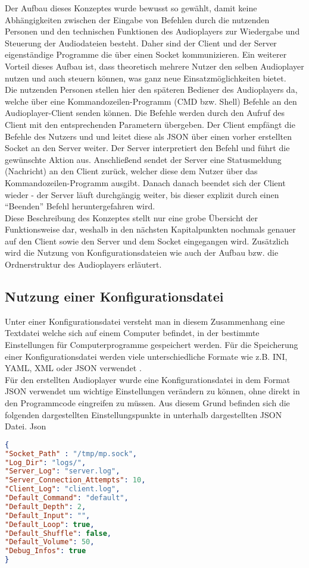 Der Aufbau dieses Konzeptes wurde bewusst so gewählt, damit keine
Abhängigkeiten zwischen der Eingabe von Befehlen durch die nutzenden Personen
und den technischen Funktionen des Audioplayers zur Wiedergabe und Steuerung
der Audiodateien besteht. Daher sind der Client und der Server eigenständige
Programme die über einen Socket kommunizieren. Ein weiterer Vorteil dieses
Aufbau ist, dass theoretisch mehrere Nutzer den selben Audioplayer nutzen und
auch steuern können, was ganz neue Einsatzmöglichkeiten bietet. \\ 
Die nutzenden Personen stellen hier den späteren Bediener des Audioplayers da,
welche über eine Kommandozeilen-Programm (\ac{CMD} bzw. Shell) Befehle an den
Audioplayer-Client senden können. Die Befehle werden durch den Aufruf des
Client mit den entsprechenden Parametern übergeben. Der Client empfängt die
Befehle des Nutzers und und leitet diese als \ac{JSON} über einen vorher
erstellten Socket an den Server weiter. Der Server interpretiert den Befehl und
führt die gewünschte Aktion aus. Anschließend sendet der Server eine
Statusmeldung (Nachricht) an den Client zurück, welcher diese dem Nutzer über
das Kommandozeilen-Programm ausgibt. Danach danach beendet sich der Client
wieder - der Server läuft durchgängig weiter, bis dieser explizit durch einen
\enquote{Beenden} Befehl heruntergefahren wird. \\ 
Diese Beschreibung des
Konzeptes stellt nur eine grobe Übersicht der Funktionsweise dar, weshalb in
den nächsten Kapitalpunkten nochmals genauer auf den Client sowie den Server
und dem Socket eingegangen wird. Zusätzlich wird die Nutzung von
Konfigurationsdateien wie auch der Aufbau bzw. die Ordnerstruktur des
Audioplayers erläutert.

\subsection{Nutzung einer Konfigurationsdatei}
Unter einer Konfigurationsdatei versteht man in diesem Zusammenhang eine
Textdatei welche sich auf einem Computer befindet, in der bestimmte
Einstellungen für Computerprogramme gespeichert werden. Für die Speicherung
einer Konfigurationsdatei werden viele unterschiedliche Formate wie z.B.
\ac{INI}, \ac{YAML}, \ac{XML} oder \ac{JSON} verwendet
\autocite{hard_coding_and_soft_coding_2019} \autocite{lott_2019}. \\ 
Für den erstellten Audioplayer wurde eine Konfigurationsdatei in dem Format
\ac{JSON} verwendet um wichtige Einstellungen verändern zu können, ohne direkt
in den Programmcode eingreifen zu müssen. Aus diesem Grund befinden sich die
folgenden dargestellten Einstellungspunkte in unterhalb dargestellten \ac{JSON}
Datei. 
Json
\begin{lstlisting}[language=Json]
{
"Socket_Path" : "/tmp/mp.sock",
"Log_Dir": "logs/",
"Server_Log": "server.log",
"Server_Connection_Attempts": 10,
"Client_Log": "client.log",
"Default_Command": "default",
"Default_Depth": 2,
"Default_Input": "",
"Default_Loop": true,
"Default_Shuffle": false,
"Default_Volume": 50,
"Debug_Infos": true
}
\end{lstlisting}

